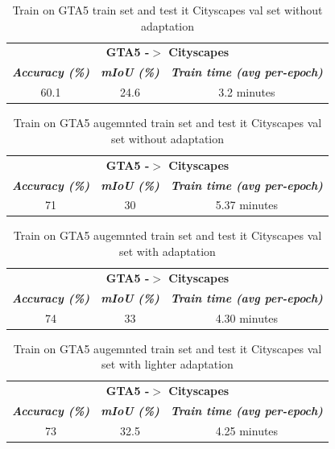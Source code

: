 \documentclass[conference]{IEEEtran}
\begin{document}
\begin{table}[tb]
\caption{Train on GTA5 train set and test it Cityscapes val set without adaptation}
\begin{center}
\begin{tabular}{|c|c|c|}
\hline
\multicolumn{3}{|c|}{\textbf{GTA5 -$>$ Cityscapes}} \\
\cline{1-3} 
\textbf{\textit{Accuracy (\%)}}& \textbf{\textit{mIoU (\%)}}& \textbf{\textit{Train time (avg per-epoch)}} \\
\hline
60.1 & 24.6 & 3.2 minutes \\
\hline
\end{tabular}
\label{GTATOCITYSCAPESNOADAP}
\end{center}
\end{table}

\begin{table}[tb]
\caption{Train on GTA5 augemnted train set and test it Cityscapes val set without adaptation}
\begin{center}
\begin{tabular}{|c|c|c|}
\hline
\multicolumn{3}{|c|}{\textbf{GTA5 -$>$ Cityscapes}} \\
\cline{1-3} 
\textbf{\textit{Accuracy (\%)}}& \textbf{\textit{mIoU (\%)}}& \textbf{\textit{Train time (avg per-epoch)}} \\
\hline
71 & 30 & 5.37 minutes \\
\hline
\end{tabular}
\label{GTATOCITYSCAPESNOADAPAUG}
\end{center}
\end{table}

\begin{table}[tb]
\caption{Train on GTA5 augemnted train set and test it Cityscapes val set with adaptation}
\begin{center}
\begin{tabular}{|c|c|c|}
\hline
\multicolumn{3}{|c|}{\textbf{GTA5 -$>$ Cityscapes}} \\
\cline{1-3} 
\textbf{\textit{Accuracy (\%)}}& \textbf{\textit{mIoU (\%)}}& \textbf{\textit{Train time (avg per-epoch)}} \\
\hline
74 & 33 & 4.30 minutes \\
\hline
\end{tabular}
\label{GTATOCITYSCAPESADAP}
\end{center}
\end{table}

\begin{table}[tb]
\caption{Train on GTA5 augemnted train set and test it Cityscapes val set with lighter adaptation}
\begin{center}
\begin{tabular}{|c|c|c|}
\hline
\multicolumn{3}{|c|}{\textbf{GTA5 -$>$ Cityscapes}} \\
\cline{1-3} 
\textbf{\textit{Accuracy (\%)}}& \textbf{\textit{mIoU (\%)}}& \textbf{\textit{Train time (avg per-epoch)}} \\
\hline
73& 32.5& 4.25 minutes\\
\hline
\end{tabular}
\label{GTATOCITYSCAPESADAPLIGHT}
\end{center}
\end{table}
\end{document}
